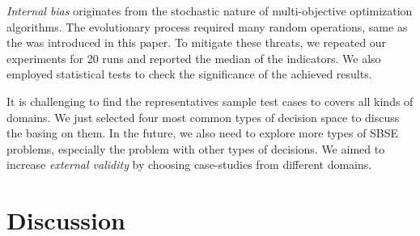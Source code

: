 \textit{Internal bias} originates from the stochastic nature of multi-objective optimization algorithms. The evolutionary process required many
random operations, same as the \flash was introduced in this paper.
To mitigate these threats, we repeated our experiments for 20 runs
and reported the median of the indicators. We also employed
statistical tests to check the significance of the achieved results.

It is challenging to find the representatives sample test cases to covers all kinds of domains. We just selected four most
common types of decision space to discuss the \flash basing on
them. In the future, we also need to explore more types of SBSE
problems, especially the problem with other types of decisions. We aimed to increase {\em external validity} by choosing case-studies from different domains. 


\section{Discussion}
